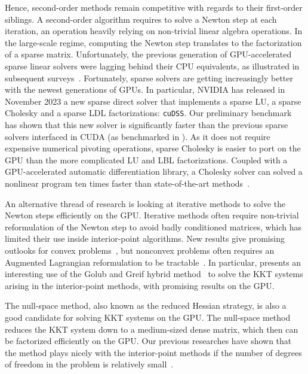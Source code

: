 Hence, second-order methods remain competitive with regards to their first-order
siblings. A second-order algorithm requires to solve a Newton step at each
iteration, an operation heavily relying on non-trivial linear algebra operations.
In the large-scale regime, computing the Newton step translates to the
factorization of a sparse matrix.
Unfortunately, the previous generation of GPU-accelerated sparse linear
solvers were lagging behind their CPU equivalents, as illustrated in
subsequent surveys~\cite{tasseff2019exploring,swirydowicz2021linear}.
Fortunately, sparse solvers are getting increasingly better with the newest
generations of GPUs. In particular, NVIDIA has released in November 2023
a new sparse direct solver that implements a sparse LU, a sparse Cholesky
and a sparse LDL factorizations: {\tt cuDSS}. Our
preliminary benchmark has shown that this new solver is significantly
faster than the previous sparse solvers interfaced in CUDA (as benchmarked in \cite{swirydowicz2021linear}).
As it does not require expensive numerical pivoting operations, sparse Cholesky
is easier to port on the GPU than the more complicated LU and LBL factorizations.
Coupled with a GPU-accelerated automatic differentiation library, a Cholesky
solver can solved a nonlinear program ten times faster than state-of-the-art
methods~\cite{shin2023accelerating}.

An alternative thread of research is looking at iterative methods to solve the Newton steps efficiently on the GPU.
Iterative methods often require non-trivial reformulation of the Newton step to avoid
badly conditioned matrices, which has limited their use inside interior-point
algorithms. New results give promising outlooks for convex problems~\cite{ghannad2022linear},
but nonconvex problems often requires an Augmented Lagrangian reformulation
to be tractable~\cite{cao2016augmented,regev2023hykkt}. In particular,
\cite{regev2023hykkt} presents an interesting use of the Golub and Greif
hybrid method~\cite{golub2003solving} to solve the KKT systems arising in
the interior-point methods, with promising results on the GPU.

The null-space method, also known as the reduced Hessian strategy,
is also a good candidate for solving KKT systems on the GPU.
The null-space method reduces the KKT system down to
a medium-sized dense matrix, which then can be factorized efficiently on the GPU.
Our previous researches have shown that the method plays nicely with the interior-point
methods if the number of degrees of freedom in the problem is relatively small~\cite{pacaud2022condensed}.

